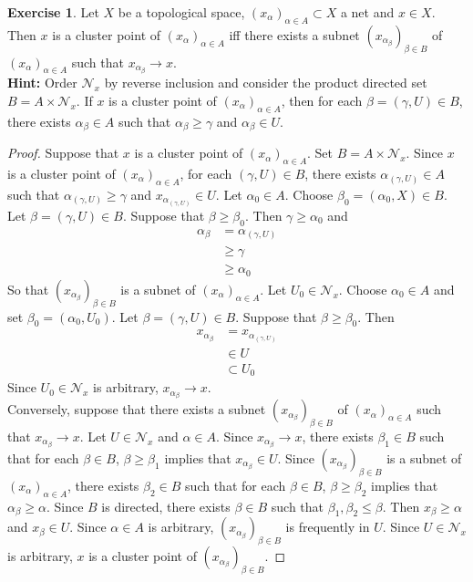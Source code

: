\documentclass[12pt]{amsart}
\theoremstyle{definition}
\newtheorem{ex}[definition]{Exercise}
\newcommand{\al}{\alpha}
\newcommand{\gam}{\gamma}
\newcommand{\be}{\beta}
\newcommand{\MN}{\mathcal{N}}
\newcommand{\tbf}[1]{\textbf{#1}}
\DeclareMathOperator*{\0}{\mbf{0}}
\DeclareMathOperator*{\1}{\mbf{1}}
\newcommand{\lex}[1]{\label{ex:#1}}
\begin{document}
	\begin{ex} \lex{33015}
	Let $X$ be a topological space, $(x_{\al})_{\al \in A} \subset X$ a net and $x \in X$. Then $x$ is a cluster point of $(x_{\al})_{\al \in A}$ iff there exists a subnet $(x_{\al_{\be}})_{\be \in B}$ of $(x_{\al})_{\al \in A}$ such that $x_{\al_{\be}} \rightarrow x$. \\
	\tbf{Hint:} Order $\MN_x$ by reverse inclusion and consider the product directed set $B = A \times \MN_x$. If $x$ is a cluster point of $(x_{\al})_{\al \in A}$, then for each $\be = (\gam, U) \in B$, there exists $\al_{\be} \in A$ such that $\al_{\be} \geq \gam$ and $\al_{\be} \in U$. 
	\end{ex}

	\begin{proof}
		Suppose that $x$ is a cluster point of $(x_{\al})_{\al \in A}$. Set $B = A \times \MN_x$. Since $x$ is a cluster point of $(x_{\al})_{\al \in A}$, for each $(\gam, U) \in B$, there exists $\al_{(\gam, U)} \in A$ such that $\al_{(\gam, U)} \geq \gam$ and $x_{\al_{(\gam, U)}} \in U$. Let $\al_0 \in A$. Choose $\be_0 = (\al_0, X) \in B$. Let $\be = (\gam, U) \in B$. Suppose that $\be \geq \be_0$. Then $\gam \geq \al_0$ and 
		\begin{align*}
			\al_{\be}
			&= \al_{(\gam, U)} \\
			& \geq \gam \\
			& \geq \al_0
		\end{align*}
		So that $(x_{\al_{\be}})_{\be \in B}$ is a subnet of $(x_{\al})_{\al \in A}$. Let $U_0 \in \MN_x$. Choose $\al_0 \in A$ and set $\be_0 = (\al_0, U_0)$. Let $\be = (\gam, U) \in B$. Suppose that $\be \geq \be_0$. Then 
		\begin{align*}
			x_{\al_{\be}} 
			&= x_{\al_{(\gam, U)}} \\
			& \in U \\
			&\subset U_0
		\end{align*} 
		Since $U_0 \in \MN_x$ is arbitrary, $x_{\al_{\be}} \rightarrow x$. \\
		Conversely, suppose that there exists a subnet $(x_{\al_{\be}})_{\be \in B}$ of $(x_{\al})_{\al \in A}$ such that $x_{\al_{\be}} \rightarrow x$. Let $U \in \MN_x$ and $\al \in A$. Since $x_{\al_{\be}} \rightarrow x$, there exists $\be_1 \in B$ such that for each $\be \in B$, $\be \geq \be_1$ implies that $x_{\al_{\be}} \in U$. Since $(x_{\al_{\be}})_{\be \in B}$ is a subnet of $(x_{\al})_{\al \in A}$, there exists $\be_2 \in B$ such that for each $\be \in B$, $\be \geq \be_2$ implies that $\al_{\be} \geq \al$. Since $B$ is directed, there exists $\be \in B$ such that $\be_1, \be_2 \leq \be$. Then $x_{\be} \geq \al$ and $x_{\be} \in U$. Since $\al \in A$ is arbitrary,  $(x_{\al_{\be}})_{\be \in B}$ is frequently in $U$. Since $U \in \MN_x$ is arbitrary, $x$ is a cluster point of $(x_{\al_{\be}})_{\be \in B}$. 
	\end{proof}
	
\end{document}
